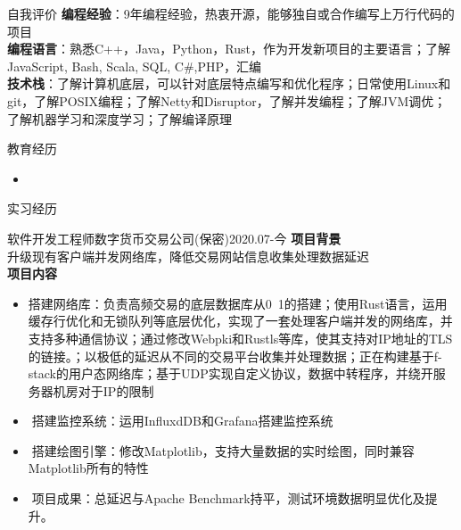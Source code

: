 \documentclass[UTF8]{resume}
\begin{document}
\begin{rSection}{自我评价}
    \textbf{编程经验}：9年编程经验，热衷开源，能够独自或合作编写上万行代码的项目\\
    \textbf{编程语言}：熟悉C++，Java，Python，Rust，作为开发新项目的主要语言；了解JavaScript, Bash, Scala, SQL, C\#,PHP，汇编\\
    \textbf{技术栈}：了解计算机底层，可以针对底层特点编写和优化程序；日常使用Linux和git，了解POSIX编程；了解Netty和Disruptor，了解并发编程；了解JVM调优；了解机器学习和深度学习；了解编译原理\\
\end{rSection}

\begin{rSection}{教育经历}
    \begin{itemize}
        \item {}
    \end{itemize}
\end{rSection}

\begin{rSection}{实习经历}
    \begin{rExperience}{软件开发工程师}{数字货币交易公司(保密)}{2020.07-今}
        \textbf{项目背景}\\
        升级现有客户端并发网络库，降低交易网站信息收集处理数据延迟\\
        \textbf{项目内容}
        \begin{itemize}
            \itemsep -0.5em \vspace{-0.5em}
            \item 搭建网络库：负责高频交易的底层数据库从0~1的搭建；使用Rust语言，运用缓存行优化和无锁队列等底层优化，实现了一套处理客户端并发的网络库，并支持多种通信协议；通过修改Webpki和Rustls等库，使其支持对IP地址的TLS的链接。；以极低的延迟从不同的交易平台收集并处理数据；正在构建基于f-stack的用户态网络库；基于UDP实现自定义协议，数据中转程序，并绕开服务器机房对于IP的限制
            \item搭建监控系统：运用InfluxdDB和Grafana搭建监控系统
            \item搭建绘图引擎：修改Matplotlib，支持大量数据的实时绘图，同时兼容Matplotlib所有的特性
            \item项目成果：总延迟与Apache Benchmark持平，测试环境数据明显优化及提升。
        \end{itemize}
    \end{rExperience}
\end{rSection}
\end{document}
